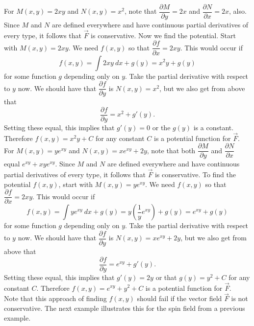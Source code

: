  {For $M(x,y) = 2xy$ and $N(x,y) = x^2$, note that $\dfrac{\partial M}{\partial y} = 2x$ and $\dfrac{\partial N}{\partial x} = 2x$, also.  Since $M$ and $N$ are defined everywhere and have continuous partial derivatives of every type, it follows that $\vec F$ is conservative.  Now we find the potential.
Start with $M(x,y) = 2xy$.  We need $f(x,y)$ so that $\dfrac{\partial f}{\partial x} = 2xy$. This would occur if
$$f(x,y) = \int 2xy \: dx + g(y) = x^2 y + g(y)$$
for some function $g$ depending only on $y$.   Take the partial derivative with respect to $y$ now.  We should have that $\dfrac{\partial f}{\partial y}$ is $N(x,y) = x^2$, but we also get from above that
$$\dfrac{\partial f}{\partial y} = x^2 + g'(y).$$
Setting these equal, this implies that $g'(y) = 0$ or the $g(y)$ is a constant.  Therefore $f(x,y) = x^2 y + C$ for any constant $C$ is a potential function for $\vec F$.
}\\

 {For $M(x,y) = y e^{xy}$ and $N(x,y) = x e^{xy} + 2y$, note that both $\dfrac{\partial M}{\partial y}$ and $\dfrac{\partial N}{\partial x}$ equal $e^{xy} + xy e^{xy}$.  Since $M$ and $N$ are defined everywhere and have continuous partial derivatives of every type, it follows that $\vec F$ is conservative.  To find the potential $f(x,y)$, start with $M(x,y) = y e^{xy}$.  We need $f(x,y)$ so that $\dfrac{\partial f}{\partial x} = 2xy$. This would occur if
$$f(x,y) = \int y e^{xy} \: dx + g(y) = y \left( \dfrac{1}{y} e^{xy} \right) + g(y) = e^{xy} + g(y)$$
for some function $g$ depending only on $y$.   Take the partial derivative with respect to $y$ now.  We should have that $\dfrac{\partial f}{\partial y}$ is $N(x,y) = x e^{xy} + 2y$, but we also get from above that
$$\dfrac{\partial f}{\partial y} = e^{xy} + g'(y).$$
Setting these equal, this implies that $g'(y) = 2y$ or that $g(y) = y^2 + C$ for any constant $C$.  Therefore $f(x,y) = e^{xy} + y^2 + C$ is a potential function for $\vec F$.
}\\



Note that this approach of finding $f(x,y)$ should fail if the vector field $\vec F$ is not conservative.  The next example illustrates this for the spin field from a previous example.\\

